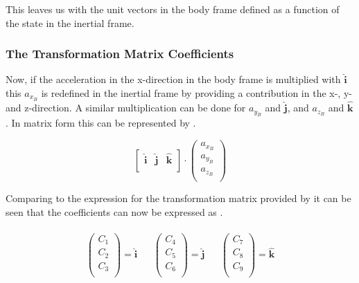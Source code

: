 \noindent
This leaves us with the unit vectors in the body frame defined as a function of the state in the inertial frame. 

\subsubsection{The Transformation Matrix Coefficients}
\label{subsubsec:filTransMat}
Now, if the acceleration in the x-direction in the body frame is multiplied with $\mathbf{\hat{i}}$ this $a_{x_{B}}$ is redefined in the inertial frame by providing a contribution in the x-, y- and z-direction. A similar multiplication can be done for $a_{y_{B}}$ and $\mathbf{\hat{j}}$, and $a_{z_{B}}$ and $\mathbf{\hat{k}}$. In matrix form this can be represented by .

\begin{equation} \label{eq:firstFillEx}
\left[
\begin{matrix}
\mathbf{\hat{i}} &
\mathbf{\hat{j}} &
\mathbf{\hat{k}} \\
\end{matrix}
\right]
\cdot
\begin{pmatrix}
a_{x_{B}} \\
a_{y_{B}} \\
a_{z_{B}} \\
\end{pmatrix}
\end{equation}

\noindent
Comparing  to the expression for the transformation matrix provided by  it can be seen that the coefficients can now be expressed as .

\begin{align} \label{eq:transCoeff}
\begin{split}
\begin{pmatrix}
C_{1} \\
C_{2} \\
C_{3} \\
\end{pmatrix}
=
\mathbf{\hat{i}}
\end{split}
&
\begin{split}
\begin{pmatrix}
C_{4} \\
C_{5} \\
C_{6} \\
\end{pmatrix}
=
\mathbf{\hat{j}}
\end{split}
&
\begin{split}
\begin{pmatrix}
C_{7} \\
C_{8} \\
C_{9} \\
\end{pmatrix}
=
\mathbf{\hat{k}}
\end{split}
\end{align}

